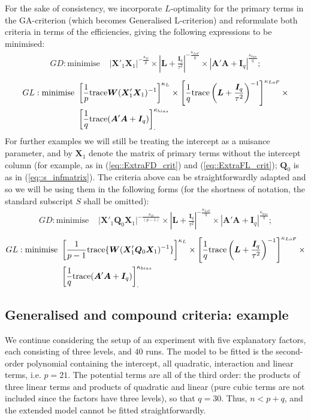 For the sake of consistency, we incorporate $L$-optimality for the primary terms in the GA-criterion (which becomes Generalised L-criterion) and reformulate both criteria in terms of the efficiencies, giving the following expressions to be minimised:
\begin{align}
\label{eq::GD_eff}
GD:\mbox{minimise }&|\bm{X}'_{1}\bm{X}_1|^{-\frac{\kappa_{D}}{p}}\times \left|\bm{L}+\frac{\bm{I}_{q}}{\tau^{2}}\right|^{-\frac{\kappa_{LoF}}{q}} \times |\bm{A}'\bm{A}+\bm{I}_{q}|^{\frac{\kappa_{bias}}{q}};
\end{align} 
\begin{align} 
\label{eq::GL_eff}
GL:\mbox{minimise }&\left[\frac{1}{p}\mbox{trace}\bm{W}(\bm{X}'_{1}\bm{X}_1)^{-1}\right]^{\kappa_{L}}\times \left[\frac{1}{q}\mbox{trace}\left(\bm{L}+\frac{\bm{I}_{q}}{\tau^{2}}\right)^{-1}\right]^{\kappa_{LoF}}\times\notag\\&\left[\frac{1}{q}\mbox{trace}(\bm{A}'\bm{A}+\bm{I}_{q})\right]_{.}^{\kappa_{bias}}
\end{align} 
For further examples we will still be treating the intercept as a nuisance parameter, and by $\bm{X}_1$ denote the matrix of primary terms without the intercept column (for example, as in (\ref{eq::ExtraFD_crit}) and (\ref{eq::ExtraFL_crit}); $\bm{Q}_0$ is as in (\ref{eq::s_infmatrix}). The criteria above can be straightforwardly adapted and so we will be using them in the following forms (for the shortness of notation, the standard subscript $S$ shall be omitted):
\begin{align}
\label{eq::GDs_eff}
GD:\mbox{minimise }&\vert\bm{X}'_1\bm{Q}_{0}\bm{X}_1\vert^{-\frac{\kappa_{D}}{(p-1)}}\times \left|\bm{L}+\frac{\bm{I}_{q}}{\tau^{2}}\right|^{-\frac{\kappa_{LoF}}{q}} \times |\bm{A}'\bm{A}+\bm{I}_{q}|^{\frac{\kappa_{bias}}{q}};
\end{align} 
\begin{align} 
\label{eq::GLs_eff}
GL:\mbox{minimise }&\left[\frac{1}{p-1}\mbox{trace}\{\bm{W}(\bm{X}'_{1}\bm{Q}_{0}\bm{X}_{1})^{-1}\}\right]^{\kappa_{L}}\times \left[\frac{1}{q}\mbox{trace}\left(\bm{L}+\frac{\bm{I}_{q}}{\tau^{2}}\right)^{-1}\right]^{\kappa_{LoF}}\times\notag\\&\left[\frac{1}{q}\mbox{trace}(\bm{A}'\bm{A}+\bm{I}_{q})\right]_{.}^{\kappa_{bias}}
\end{align} 

\subsection{Generalised and compound criteria: example}
We continue considering the setup of an experiment with five explanatory factors, each consisting of three levels, and $40$ runs. The model to be fitted is the second-order polynomial containing the intercept, all quadratic, interaction and linear terms, i.e. $p=21$. The potential terms are all of the third order: the products of three linear terms and products of quadratic and linear (pure cubic terms are not included since the factors have three levels), so that $q=30$. Thus, $n<p+q$, and the extended model cannot be fitted straightforwardly.

